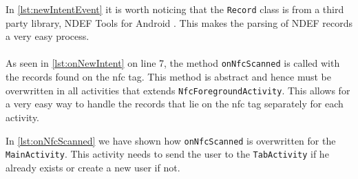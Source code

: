 In \autoref{lst:newIntentEvent} it is worth noticing that the \lstinline|Record| class is from a third party library, NDEF Tools for Android \citep{ndeftools}. This makes the parsing of NDEF records a very easy process.\\\\
As seen in \autoref{lst:onNewIntent} on line 7, the method \lstinline|onNfcScanned| is called with the records found on the \ac{nfc} tag. This method is abstract and hence must be overwritten in all activities that extends \lstinline|NfcForegroundActivity|. This allows for a very easy way to handle the records that lie on the \ac{nfc} tag separately for each activity.

In \autoref{lst:onNfcScanned} we have shown how \lstinline|onNfcScanned| is overwritten for the \lstinline|MainActivity|. This activity needs to send the user to the \lstinline|TabActivity| if he already exists or create a new user if not.


